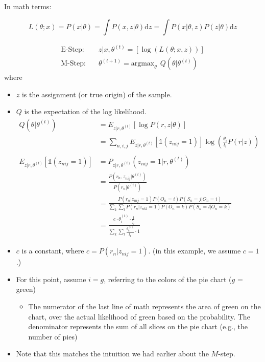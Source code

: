 \documentclass[10pt]{article}
\begin{document}
In math terms:
\begin{flushleft}
\[L(\theta; x) = P(x \vert \theta) = \int P(x, z \vert \theta) \text{d}z = \int P(x \vert \theta, z) P(z \vert \theta) \text{d}z\]
\end{flushleft}
\begin{align*}
    \text{E-Step:~~~}& z \vert x, \theta^{(t)} = [\log(L(\theta; x, z))]\\
    \text{M-Step:~~~}& \theta^{(t + 1)} = \text{argmax}_\theta \:\: Q(\theta \vert \theta^{(t)})
\end{align*}
where 
\begin{itemize}
    \item $z$ is the assignment (or true origin) of the sample.
    \item $Q$ is the expectation of the log likelihood.
    \begin{align*}
        Q(\theta \vert \theta^{(t)}) &= E_{z \vert r, \theta^{(t)}} [\log P(r, z \vert \theta)]\\
        &= \sum_{n, i, j} E_{z \vert r, \theta^{(t)}} [\mathds{1}(z_{nij} = 1)] \log\left(\frac{\theta_i}{l_i} P(r \vert z)\right)\\
        \\
        E_{z \vert r, \theta^{(t)}} [\mathds{1}(z_{nij} = 1)] &= P_{z \vert r, \theta^{(t)}} (z_{nij} = 1 \vert r, \theta^{(t)})\\
        &= \frac{P(r_n, z_{nij} \vert \theta^{(t)})}{P(r_n \vert \theta^{(t)})}\\
        &= \frac{P(r_n \vert z_{nij} = 1) P(O_n = i) P(S_n = j \vert O_n = i)}{\sum_k \sum_l P(r_n \vert z_{nkl} = 1) P(O_n = k) P(S_n = l \vert O_n = k)}\\
        &= \frac{c \cdot \theta_i^{(t)} \cdot \frac{1}{\tilde{l_i}}}{\sum_k \sum_l \frac{\theta_k^{(t)}}{\tilde{l_k}} \cdot 1}
    \end{align*}
    \item $c$ is a constant, where $c = P(r_n \vert z_{nij} = 1)$.  (in this example, we assume $c = 1$.)
    \item For this point, assume $i = g$, referring to the colors of the pie chart ($g$ = green)
    \begin{itemize}
        \item The numerator of the last line of math represents the area of green on the chart, over the actual likelihood of green based on the probability.  The denominator represents the sum of all slices on the pie chart (e.g., the number of pies)
    \end{itemize}
    \item Note that this matches the intuition we had earlier about the $M$-step.
\end{itemize}
\end{document}
